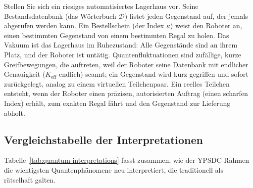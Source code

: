 \documentclass[12pt,a4paper]{article}
\theoremstyle{remark}
\begin{document}
	Stellen Sie sich ein riesiges automatisiertes Lagerhaus vor. Seine Bestandsdatenbank (das Wörterbuch $\mathcal{D}$) listet jeden Gegenstand auf, der jemals abgerufen werden kann. Ein Bestellschein (der Index $\kappa$) weist den Roboter an, einen bestimmten Gegenstand von einem bestimmten Regal zu holen. Das Vakuum ist das Lagerhaus im Ruhezustand: Alle Gegenstände sind an ihrem Platz, und der Roboter ist untätig. Quantenfluktuationen sind zufällige, kurze Greifbewegungen, die auftreten, weil der Roboter seine Datenbank mit endlicher Genauigkeit ($K_{\mathrm{eff}}$ endlich) scannt; ein Gegenstand wird kurz gegriffen und sofort zurückgelegt, analog zu einem virtuellen Teilchenpaar. Ein reelles Teilchen entsteht, wenn der Roboter einen präzisen, autorisierten Auftrag (einen scharfen Index) erhält, zum exakten Regal fährt und den Gegenstand zur Lieferung abholt.
	
	\medskip
	
	\subsection{Vergleichstabelle der Interpretationen}
	
	Tabelle~\ref{tab:quantum-interpretations} fasst zusammen, wie der YPSDC-Rahmen die wichtigsten Quantenphänomene neu interpretiert, die traditionell als rätselhaft galten.
	
\end{document}
